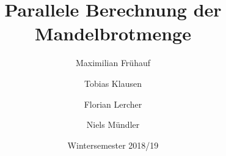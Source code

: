 \documentclass[course=erap]{aspdoc}
\author{Maximilian Frühauf \and Tobias Klausen \and Florian Lercher \and Niels Mündler}
\title{Parallele Berechnung der Mandelbrotmenge}
\date{Wintersemester 2018/19}
\begin{document}
\maketitle

\tableofcontents















\listoffigures
\pagebreak





\end{document}
